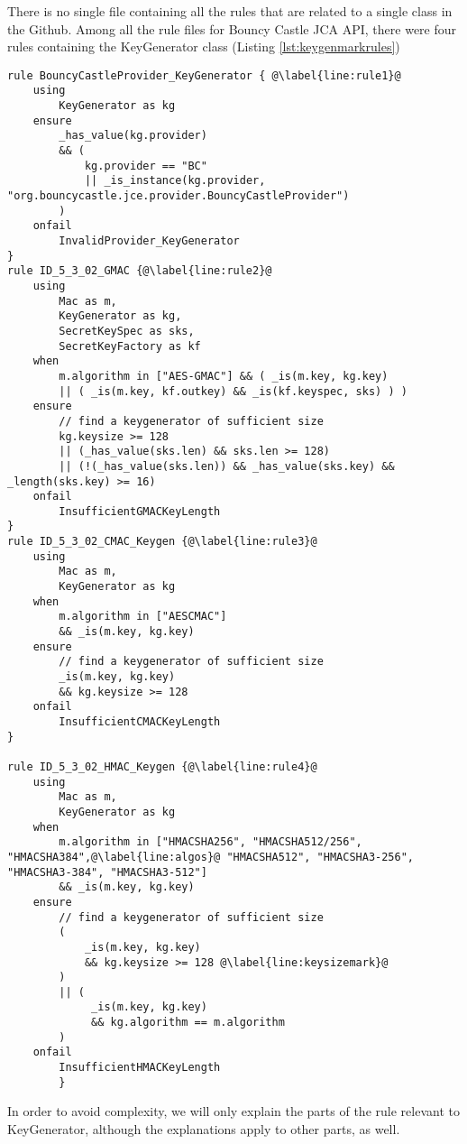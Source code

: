 There is no single file containing all the \MARK{} rules that are related to a single class in the Github. Among all the \MARK{} rule files for Bouncy Castle JCA API, there were four rules containing the KeyGenerator class (Listing \ref{lst:keygenmarkrules})

\begin{lstlisting}[language=MARK2,caption= {\MARK{} rules for KeyGenerator of Bouncy Castle JCA API.}, label={lst:keygenmarkrules}, escapechar=@]
rule BouncyCastleProvider_KeyGenerator { @\label{line:rule1}@
    using
        KeyGenerator as kg
    ensure 
        _has_value(kg.provider)
        && (
            kg.provider == "BC"
            || _is_instance(kg.provider, "org.bouncycastle.jce.provider.BouncyCastleProvider")
        )
    onfail
        InvalidProvider_KeyGenerator
}
rule ID_5_3_02_GMAC {@\label{line:rule2}@
    using
        Mac as m,
        KeyGenerator as kg,
        SecretKeySpec as sks,
        SecretKeyFactory as kf
    when
        m.algorithm in ["AES-GMAC"] && ( _is(m.key, kg.key)
        || ( _is(m.key, kf.outkey) && _is(kf.keyspec, sks) ) )
    ensure
        // find a keygenerator of sufficient size
        kg.keysize >= 128
        || (_has_value(sks.len) && sks.len >= 128)
        || (!(_has_value(sks.len)) && _has_value(sks.key) && _length(sks.key) >= 16)
    onfail
        InsufficientGMACKeyLength
}
rule ID_5_3_02_CMAC_Keygen {@\label{line:rule3}@
    using
        Mac as m,
        KeyGenerator as kg
    when
        m.algorithm in ["AESCMAC"]
        && _is(m.key, kg.key)
    ensure
        // find a keygenerator of sufficient size
        _is(m.key, kg.key)
        && kg.keysize >= 128
    onfail
        InsufficientCMACKeyLength
}

rule ID_5_3_02_HMAC_Keygen {@\label{line:rule4}@
    using
        Mac as m,
        KeyGenerator as kg
    when
        m.algorithm in ["HMACSHA256", "HMACSHA512/256", "HMACSHA384",@\label{line:algos}@ "HMACSHA512", "HMACSHA3-256", "HMACSHA3-384", "HMACSHA3-512"]
        && _is(m.key, kg.key)
    ensure
        // find a keygenerator of sufficient size
        (
            _is(m.key, kg.key)
            && kg.keysize >= 128 @\label{line:keysizemark}@
        )
        || (
             _is(m.key, kg.key)
             && kg.algorithm == m.algorithm
        )
    onfail
        InsufficientHMACKeyLength
        }
\end{lstlisting}


In order to avoid complexity, we will only explain the parts of the rule relevant to KeyGenerator, although the explanations apply to other parts, as well.

